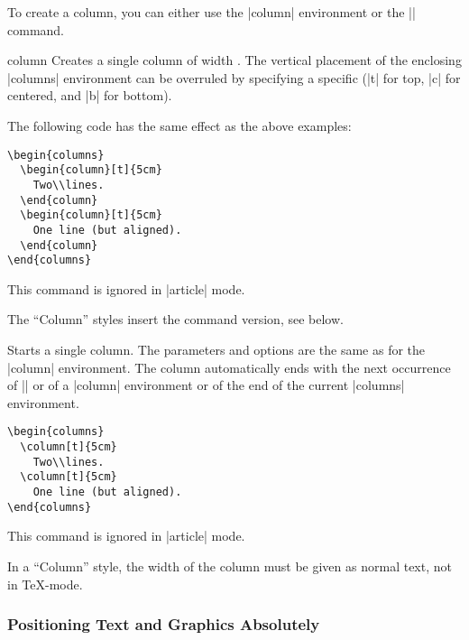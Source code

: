To create a column, you can either use the |column| environment or the
|\column| command. 

\begin{environment}{{column}}
  Creates a single column of width . The vertical
  placement of the enclosing |columns| environment can be overruled by
  specifying a specific  (|t| for top, |c| for
  centered, and |b| for bottom). 

  \example The following code has the same effect as the above examples:
\begin{verbatim}
\begin{columns}
  \begin{column}[t]{5cm}
    Two\\lines.
  \end{column}
  \begin{column}[t]{5cm}
    One line (but aligned).
  \end{column}
\end{columns}
\end{verbatim}
  \articlenote
  This command is ignored in |article| mode.

  \lyxnote
  The ``Column'' styles insert the command version, see below.
\end{environment}

\begin{command}{{\column}}
  Starts a single column. The parameters and options are the same as
  for the |column| environment. The column automatically ends with the
  next occurrence of |\column| or of a |column| environment or of the
  end of the current |columns| environment.

  \example 
\begin{verbatim}
\begin{columns}
  \column[t]{5cm}
    Two\\lines.
  \column[t]{5cm}
    One line (but aligned).
\end{columns}
\end{verbatim}
  \articlenote
  This command is ignored in |article| mode.

  \lyxnote
  In a ``Column'' style, the width of the column must be given as
  normal text, not in \TeX-mode.
\end{command}



\subsubsection{Positioning Text and Graphics Absolutely}

